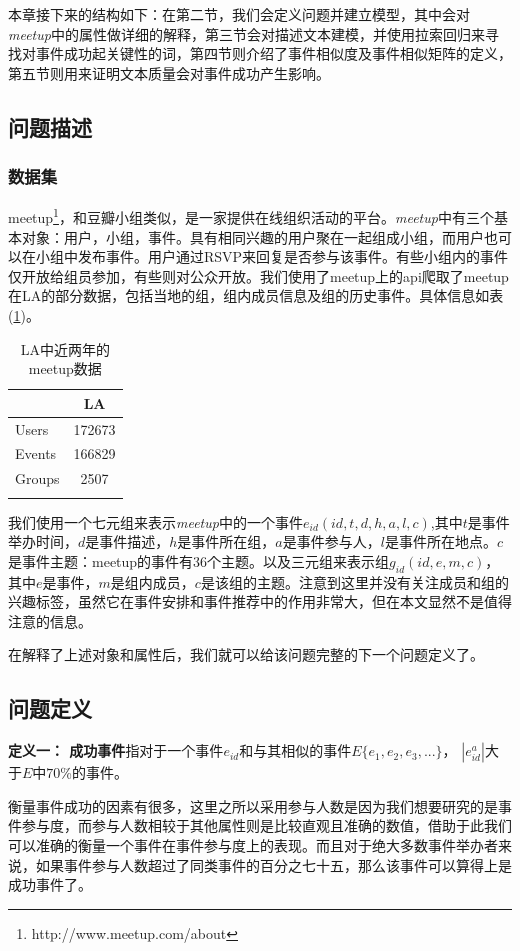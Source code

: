 \documentclass[12pt]{template}
\begin{document}
本章接下来的结构如下：在第二节，我们会定义问题并建立模型，其中会对\textit{meetup}中的属性做详细的解释，第三节会对描述文本建模，并使用拉索回归来寻找对事件成功起关键性的词，第四节则介绍了事件相似度及事件相似矩阵的定义，第五节则用来证明文本质量会对事件成功产生影响。

\subsection{问题描述}
\subsubsection{数据集}

meetup\footnote{http://www.meetup.com/about}，和豆瓣小组类似，是一家提供在线组织活动的平台。\textit{meetup}中有三个基本对象：用户，小组，事件。具有相同兴趣的用户聚在一起组成小组，而用户也可以在小组中发布事件。用户通过RSVP来回复是否参与该事件。有些小组内的事件仅开放给组员参加，有些则对公众开放。我们使用了meetup上的api爬取了meetup在LA的部分数据，包括当地的组，组内成员信息及组的历史事件。具体信息如表(\ref{t1})。

\begin{longtable}[HTBP]{@{}lc@{}}
\toprule
& LA\tabularnewline
\midrule
\endhead
Users & 172673\tabularnewline
Events & 166829\tabularnewline
Groups & 2507\tabularnewline
\bottomrule
\label{t1}
\caption{LA中近两年的meetup数据}

\end{longtable}

我们使用一个七元组来表示\textit{meetup}中的一个事件\(e_{id}(id,t,d,h,a,l,c)\),其中\(t\)是事件举办时间，\(d\)是事件描述，\(h\)是事件所在组，\(a\)是事件参与人，\(l\)是事件所在地点。\(c\)是事件主题：meetup的事件有36个主题。以及三元组来表示组\(g_{id}(id,e,m,c)\)，其中\(e\)是事件，\(m\)是组内成员，\(c\)是该组的主题。注意到这里并没有关注成员和组的兴趣标签，虽然它在事件安排和事件推荐中的作用非常大，但在本文显然不是值得注意的信息。

在解释了上述对象和属性后，我们就可以给该问题完整的下一个问题定义了。

\subsection{问题定义}
\textbf{定义一： 成功事件}指对于一个事件\(e_{id}\)和与其相似的事件\(E\{e_1,e_2,e_3,...\}\)，
\(|e_{id}^a|\)大于\(E\)中\(70\)\%的事件。

衡量事件成功的因素有很多，这里之所以采用参与人数是因为我们想要研究的是事件参与度，而参与人数相较于其他属性则是比较直观且准确的数值，借助于此我们可以准确的衡量一个事件在事件参与度上的表现。而且对于绝大多数事件举办者来说，如果事件参与人数超过了同类事件的百分之七十五，那么该事件可以算得上是成功事件了。
\end{document}
